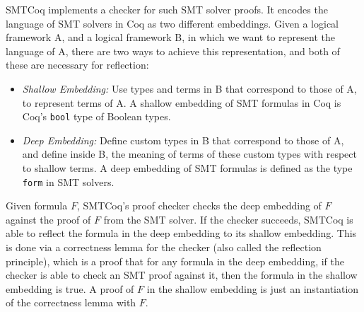 \documentclass{article}
\begin{document}
	SMTCoq implements a checker for 
	such SMT solver proofs. It encodes
	the language of SMT solvers
	in Coq as two different embeddings. 
	Given a logical framework A, and 
	a logical framework B, in which we 
	want to represent the language of A, 
	there are two ways to achieve this
	representation, and 
	both of these are necessary for 
	reflection:
	\begin{itemize}
		\item \textit{Shallow Embedding: }
		Use types and terms in B that 
		correspond to those of A, to 
		represent terms of A. A shallow
		embedding of SMT formulas in 
		Coq is Coq's \texttt{bool} 
		type of Boolean types.
		\item\textit{Deep Embedding: }
		Define custom types in B that 
		correspond to those of A, and 
		define inside B, the meaning of 
		terms of these custom types with 
		respect to shallow terms. A 
		deep embedding of SMT formulas 
		is defined as the type 
		\texttt{form} in SMT solvers.
	\end{itemize}

	Given formula $F$, SMTCoq's proof 
	checker checks the deep embedding of 
	$F$ against the proof of $F$ from the 
	SMT solver. If the checker succeeds, 
	SMTCoq is able to reflect the formula in 
	the deep embedding to its shallow 
	embedding. This is done via a 
	correctness lemma for the checker
	(also called the reflection principle),
	which is a proof that for any 
	formula in the deep embedding, if 
	the checker is able to check an SMT
	proof against it, then the formula in 
	the shallow embedding is true. A 
	proof of $F$ in the shallow 
	embedding is just an instantiation of 
	the correctness lemma with $F$.
	
\end{document}
